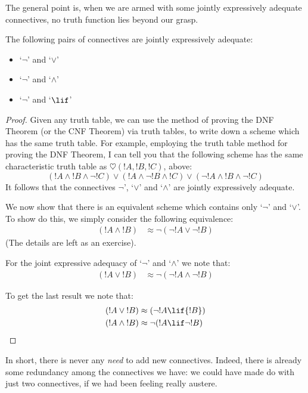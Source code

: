 \documentclass[../../../include/open-logic-section]{subfiles}
\begin{document}
The general point is, when we are armed with some jointly expressively adequate connectives, no truth function lies beyond our grasp. 
	\begin{thm}
		The following pairs of connectives are jointly expressively adequate:
			\begin{itemize}
				\item `$\lnot$' and `$\lor$'
				\item `$\lnot$' and `$\land$'
				\item `$\lnot$' and `$\lif$'
			\end{itemize}
			\begin{proof}
				Given any truth table, we can use the method of proving the DNF Theorem (or the CNF Theorem) via truth tables, to write down a scheme which has the same truth table. For example, employing the truth table method for proving the DNF Theorem, I can tell you that the following scheme has the same characteristic truth table as $\heartsuit({!A},{!B},{!C})$, above:
		$$({!A} \land {!B} \land \lnot {!C}) \lor ({!A} \land \lnot{!B} \land {!C}) \lor (\lnot {!A} \land {!B} \land \lnot {!C})$$			
			It follows that the connectives $\lnot$', `$\lor$' and `$\land$' are jointly expressively adequate. 

			We now show that there is an equivalent scheme which contains only `$\lnot$' and `$\lor$'. To show do this, we simply consider the following equivalence:
		\begin{align*}
		({!A} \land {!B}) &\approx \lnot(\lnot {!A} \lor\lnot {!B})
		\end{align*}
		(The details are left as an exercise).

		For the joint expressive adequacy of `$\lnot$' and `$\land$' we note that:
		\begin{align*}
		({!A} \lor {!B}) &\approx \lnot(\lnot {!A} \land\lnot {!B})
		\end{align*}

		To get the last result we note that:
		\begin{align*}
		({!A} \lor {!B}) &\approx (\lnot {!A} \lif{!B})\\
		({!A} \land {!B}) &\approx \lnot({!A} \lif \lnot{!B})
		\end{align*}
			\end{proof}
	\end{thm}\noindent
In short, there is never any \emph{need} to add new connectives. Indeed, there is already some redundancy among the connectives we have: we could have made do with just two connectives, if we had been feeling really austere.
\end{document}
